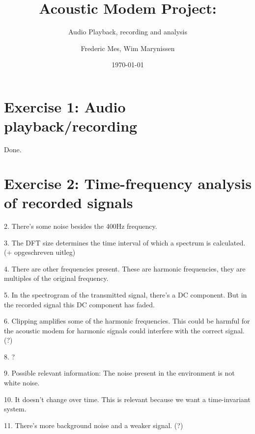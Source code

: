 \documentclass[a4paper,11pt]{article}
\title{ Acoustic Modem Project:}
\subtitle{Audio Playback, recording and analysis}
\author{Frederic Mes, Wim Marynissen}
\date{\today}
\begin{document}
\maketitle

\section{Exercise 1: Audio playback/recording}
Done.


\section{Exercise 2: Time-frequency analysis of recorded signals}

2.	There's some noise besides the 400Hz frequency.

3.	The DFT size determines the time interval of which a spectrum is calculated.
	(+ opgeschreven uitleg)
	
4.	There are other frequencies present. These are harmonic frequencies, they are
multiples of the original frequency.

5.	In the spectrogram of the transmitted signal, there's a DC component. But in
the recorded signal this DC component has faded. 

6.	Clipping amplifies some of the harmonic frequencies. This could be harmful
for the acoustic modem for harmonic signals could interfere with the correct
signal. (?)

8.	?

9. Possible relevant information: The noise present in the environment is not
white noise.

10. It doesn't change over time. This is relevant because we want a
time-invariant system.

11. There's more background noise and a weaker signal. (?)
\end{document}
